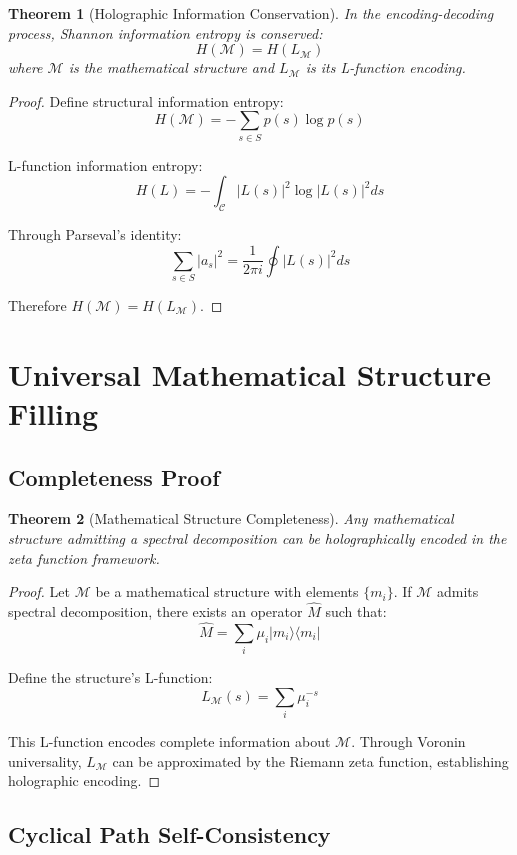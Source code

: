 \documentclass[12pt]{article}
\newtheorem{theorem}{Theorem}[section]
\begin{document}
\begin{theorem}[Holographic Information Conservation]
In the encoding-decoding process, Shannon information entropy is conserved:
$$H(\mathcal{M}) = H(L_{\mathcal{M}})$$
where $\mathcal{M}$ is the mathematical structure and $L_{\mathcal{M}}$ is its L-function encoding.
\end{theorem}

\begin{proof}
Define structural information entropy:
$$H(\mathcal{M}) = -\sum_{s \in S} p(s) \log p(s)$$

L-function information entropy:
$$H(L) = -\int_{\mathcal{C}} |L(s)|^2 \log|L(s)|^2 ds$$

Through Parseval's identity:
$$\sum_{s \in S} |a_s|^2 = \frac{1}{2\pi i} \oint |L(s)|^2 ds$$

Therefore $H(\mathcal{M}) = H(L_{\mathcal{M}})$.
\end{proof}

\section{Universal Mathematical Structure Filling}

\subsection{Completeness Proof}

\begin{theorem}[Mathematical Structure Completeness]
Any mathematical structure admitting a spectral decomposition can be holographically encoded in the zeta function framework.
\end{theorem}

\begin{proof}
Let $\mathcal{M}$ be a mathematical structure with elements $\{m_i\}$. If $\mathcal{M}$ admits spectral decomposition, there exists an operator $\hat{M}$ such that:
$$\hat{M} = \sum_i \mu_i |m_i\rangle \langle m_i|$$

Define the structure's L-function:
$$L_{\mathcal{M}}(s) = \sum_i \mu_i^{-s}$$

This L-function encodes complete information about $\mathcal{M}$. Through Voronin universality, $L_{\mathcal{M}}$ can be approximated by the Riemann zeta function, establishing holographic encoding.
\end{proof}

\subsection{Cyclical Path Self-Consistency}
\end{document}
